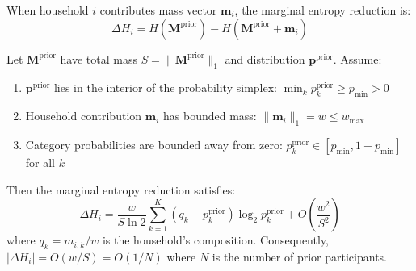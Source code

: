 \documentclass[12pt,a4paper]{article}
\begin{document}
\begin{definition}
When household $i$ contributes mass vector $\mathbf{m}_i$, the marginal entropy reduction is:
\begin{equation}
\Delta H_i = H(\mathbf{M}^{\text{prior}}) - H(\mathbf{M}^{\text{prior}} + \mathbf{m}_i)
\end{equation}
\end{definition}

\begin{theorem}
\label{thm:dmer}
Let $\mathbf{M}^{\text{prior}}$ have total mass $S = \|\mathbf{M}^{\text{prior}}\|_1$ and distribution $\mathbf{p}^{\text{prior}}$. Assume:
\begin{enumerate}
    \item[(A1)] $\mathbf{p}^{\text{prior}}$ lies in the interior of the probability simplex: $\min_k p_k^{\text{prior}} \geq p_{\min} > 0$
    \item[(A2)] Household contribution $\mathbf{m}_i$ has bounded mass: $\|\mathbf{m}_i\|_1 = w \leq w_{\max}$
    \item[(A3)] Category probabilities are bounded away from zero: $p_k^{\text{prior}} \in [p_{\min}, 1-p_{\min}]$ for all $k$
\end{enumerate}
Then the marginal entropy reduction satisfies:
\begin{equation}
\Delta H_i = \frac{w}{S \ln 2} \sum_{k=1}^K (q_k - p_k^{\text{prior}}) \log_2 p_k^{\text{prior}} + O\left(\frac{w^2}{S^2}\right)
\end{equation}
where $q_k = m_{i,k}/w$ is the household's composition. Consequently, $|\Delta H_i| = O(w/S) = O(1/N)$ where $N$ is the number of prior participants.
\end{theorem}
\end{document}
